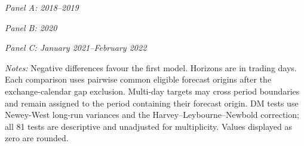 \begin{table}[p]
\centering
\caption{Matched forecast comparisons by subperiod. Entries are mean loss differences with two-sided DM $p$-values in brackets and paired sample sizes $N$.}
\label{tab:subsample-comparisons}
\scriptsize
\setlength{\tabcolsep}{2pt}

\noindent\textit{Panel A: 2018--2019}\par
\vspace{0.10em}
\vspace{0.30em}

\noindent\textit{Panel B: 2020}\par
\vspace{0.10em}
\vspace{0.30em}

\noindent\textit{Panel C: January 2021--February 2022}\par
\vspace{0.10em}
\vspace{0.30em}
\begin{minipage}{\textwidth}
\scriptsize
\textit{Notes:} Negative differences favour the first model. Horizons are in trading days. Each comparison uses pairwise common eligible forecast origins after the exchange-calendar gap exclusion. Multi-day targets may cross period boundaries and remain assigned to the period containing their forecast origin. DM tests use Newey-West long-run variances and the Harvey--Leybourne--Newbold correction; all 81 tests are descriptive and unadjusted for multiplicity. Values displayed as zero are rounded.
\end{minipage}
\end{table}
